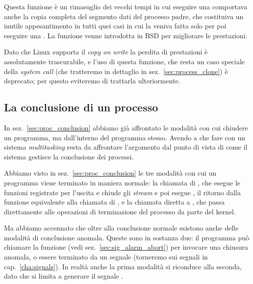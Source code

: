 Questa funzione è un rimasuglio dei vecchi tempi in cui eseguire una
 comportava anche la copia completa del segmento dati del processo
padre, che costituiva un inutile appesantimento in tutti quei casi in cui la
 veniva fatta solo per poi eseguire una . La funzione
venne introdotta in BSD per migliorare le prestazioni.

Dato che Linux supporta il \textit{copy on write} la perdita di prestazioni è
assolutamente trascurabile, e l'uso di questa funzione, che resta un caso
speciale della \textit{system call}  (che tratteremo in dettaglio
in sez.~\ref{sec:process_clone}) è deprecato; per questo eviteremo di
trattarla ulteriormente.


\subsection{La conclusione di un processo}
\label{sec:proc_termination}

In sez.~\ref{sec:proc_conclusion} abbiamo già affrontato le modalità con cui
chiudere un programma, ma dall'interno del programma stesso. Avendo a che fare
con un sistema \textit{multitasking} resta da affrontare l'argomento dal punto
di vista di come il sistema gestisce la conclusione dei processi.

Abbiamo visto in sez.~\ref{sec:proc_conclusion} le tre modalità con cui un
programma viene terminato in maniera normale: la chiamata di , che
esegue le funzioni registrate per l'uscita e chiude gli \textit{stream} e poi
esegue , il ritorno dalla funzione  equivalente alla
chiamata di , e la chiamata diretta a , che passa
direttamente alle operazioni di terminazione del processo da parte del kernel.

Ma abbiamo accennato che oltre alla conclusione normale esistono anche delle
modalità di conclusione anomala. Queste sono in sostanza due: il programma può
chiamare la funzione  (vedi sez.~\ref{sec:sig_alarm_abort}) per
invocare una chiusura anomala, o essere terminato da un segnale (torneremo sui
segnali in cap.~\ref{cha:signals}).  In realtà anche la prima modalità si
riconduce alla seconda, dato che  si limita a generare il segnale
.

